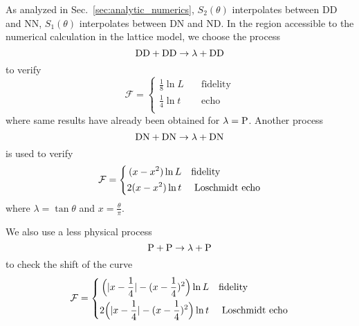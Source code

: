 As analyzed in Sec.~\ref{sec:analytic_numerics}, $S_2( \theta)$ interpolates between DD and NN, $S_1( \theta )$ interpolates between DN and ND. In the region accessible to the numerical calculation in the lattice model, we choose the process 
\begin{equation}
{\rm DD} + {\rm DD} \rightarrow  \lambda + {\rm DD}
\end{equation}
to verify
\begin{equation}
\mathcal{F} = 
\left\lbrace
\begin{aligned}
\frac{1}{8}\ln L  &\quad\text{fidelity}  \\
\frac{1}{4}\ln t   &\quad \text{echo}   \\
\end{aligned} \right.  
\end{equation}
where same results have already been obtained for $\lambda = {\rm P}$\cite{stephan_logarithmic_2013,stephan_local_2011,vasseur_universal_2014,vasseur_crossover_2013,kennes_universal_2014}. Another process
\begin{equation}
{\rm DN} + {\rm DN} \rightarrow \lambda + {\rm DN} 
\end{equation}
is used to verify
\begin{equation}
\mathcal{F} = 
\left\lbrace
\begin{aligned}
 (x - x^2 )\ln L   &  \quad {\rm fidelity} \\
 2(x - x^2 ) \ln t  & \quad \text{ Loschmidt echo} \\
\end{aligned} \right. 
\end{equation}
where $\lambda = \tan \theta$ and $x = \frac{\theta}{\pi}$. 

We also use a less physical process
\begin{equation}
  {\rm P} + {\rm P} \rightarrow \lambda + {\rm P}
\end{equation}
to check the shift of the curve
\begin{equation}
\mathcal{F} = 
\left\lbrace
\begin{aligned}
  \Big(|x-\frac{1}{4}| - (x-\frac{1}{4})^2 \Big)\ln L   &  \quad {\rm fidelity} \\
  2\Big(|x-\frac{1}{4}| - (x-\frac{1}{4})^2 \Big) \ln t  & \quad \text{ Loschmidt echo} \\
\end{aligned} \right. 
\end{equation}


